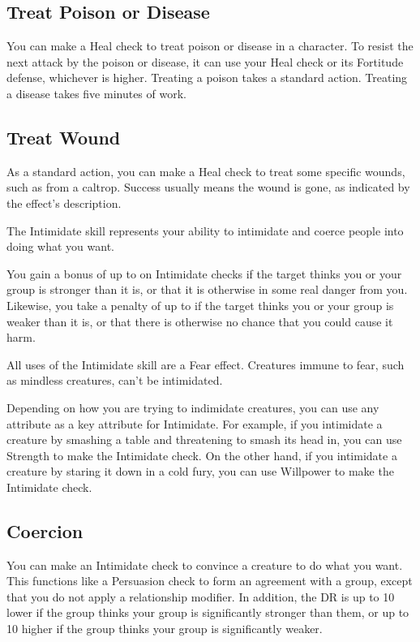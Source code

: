     \subsection{Treat Poison or Disease}
        You can make a Heal check to treat poison or disease in a character.
        To resist the next attack by the poison or disease, it can use your Heal check or its Fortitude defense, whichever is higher.
        Treating a poison takes a standard action. Treating a disease takes five minutes of work.

    \subsection{Treat Wound}
        As a standard action, you can make a Heal check to treat some specific wounds, such as from a caltrop. Success usually means the wound is gone, as indicated by the effect's description.

        The Intimidate skill represents your ability to intimidate and coerce people into doing what you want.

        You gain a bonus of up to  on Intimidate checks if the target thinks you or your group is stronger than it is, or that it is otherwise in some real danger from you. Likewise, you take a penalty of up to  if the target thinks you or your group is weaker than it is, or that there is otherwise no chance that you could cause it harm.

        All uses of the Intimidate skill are a Fear effect.
        Creatures immune to fear, such as mindless creatures, can't be intimidated.

        Depending on how you are trying to indimidate creatures, you can use any attribute as a key attribute for Intimidate.
        For example, if you intimidate a creature by smashing a table and threatening to smash its head in, you can use Strength to make the Intimidate check.
        On the other hand, if you intimidate a creature by staring it down in a cold fury, you can use Willpower to make the Intimidate check.

    \subsection{Coercion}
        You can make an Intimidate check to convince a creature to do what you want. This functions like a Persuasion check to form an agreement with a group, except that you do not apply a relationship modifier. In addition, the DR is up to 10 lower if the group thinks your group is significantly stronger than them, or up to 10 higher if the group thinks your group is significantly weaker.

